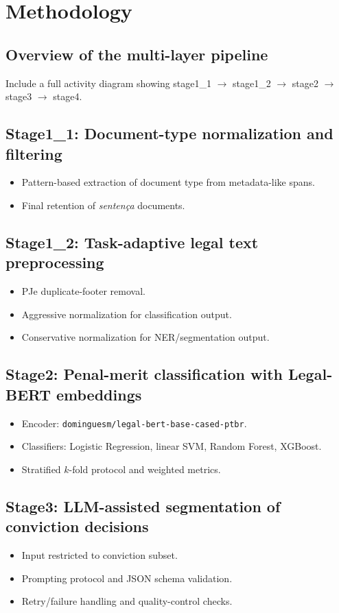 \documentclass[a4paper,fleqn]{cas-sc}
\begin{document}
\section{Methodology}
\label{sec:methodology}
\subsection{Overview of the multi-layer pipeline}
Include a full activity diagram showing stage1\_1 $\rightarrow$ stage1\_2 $\rightarrow$ stage2 $\rightarrow$ stage3 $\rightarrow$ stage4.

\subsection{Stage1\_1: Document-type normalization and filtering}
\begin{itemize}
    \item Pattern-based extraction of document type from metadata-like spans.
    \item Final retention of \textit{senten\c{c}a} documents.
\end{itemize}

\subsection{Stage1\_2: Task-adaptive legal text preprocessing}
\begin{itemize}
    \item PJe duplicate-footer removal.
    \item Aggressive normalization for classification output.
    \item Conservative normalization for NER/segmentation output.
\end{itemize}

\subsection{Stage2: Penal-merit classification with Legal-BERT embeddings}
\begin{itemize}
    \item Encoder: \texttt{dominguesm/legal-bert-base-cased-ptbr}.
    \item Classifiers: Logistic Regression, linear SVM, Random Forest, XGBoost.
    \item Stratified $k$-fold protocol and weighted metrics.
\end{itemize}

\subsection{Stage3: LLM-assisted segmentation of conviction decisions}
\begin{itemize}
    \item Input restricted to conviction subset.
    \item Prompting protocol and JSON schema validation.
    \item Retry/failure handling and quality-control checks.
\end{itemize}
\end{document}
